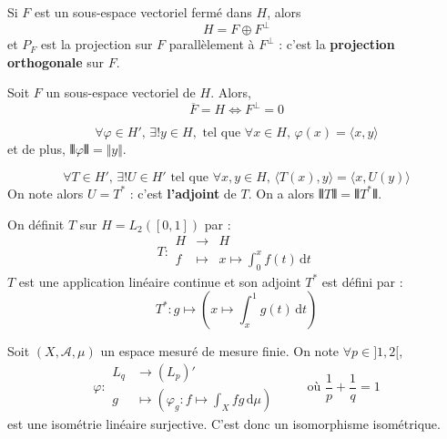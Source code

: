   \begin{theorem}
    Si $F$ est un sous-espace vectoriel fermé dans $H$, alors
    \[ H = F \oplus F^\perp \]
    et $P_F$ est la projection sur $F$ parallèlement à $F^\perp$ : c'est la \textbf{projection orthogonale} sur $F$.
  \end{theorem}

  \begin{corollary}
    Soit $F$ un sous-espace vectoriel de $H$. Alors,
    \[ \overline{F} = H \iff F^\perp = 0 \]
  \end{corollary}

  \begin{theorem}
    \[ \forall \varphi \in H', \, \exists! y \in H, \text{ tel que } \forall x \in H, \, \varphi(x) = \langle x, y \rangle \]
    et de plus, $\VERT \varphi \VERT = \Vert y \Vert$.
  \end{theorem}

  \begin{corollary}
    \[ \forall T \in H', \, \exists! U \in H' \text{ tel que } \forall x, y \in H, \, \langle T(x), y \rangle = \langle x, U(y) \rangle \]
    On note alors $U = T^*$ : c'est \textbf{l'adjoint} de $T$. On a alors $\VERT T \VERT = \VERT T^* \VERT$.
  \end{corollary}


  \begin{example}
    On définit $T$ sur $H = L_2([0,1])$ par :
    \[
    T : \begin{array}{ccc}
      H &\rightarrow& H \\
      f &\mapsto& x \mapsto \int_{0}^{x} f(t) \, \mathrm{d}t
    \end{array}
    \]
    $T$ est une application linéaire continue et son adjoint $T^*$ est défini par :
    \[ T^* : g \mapsto \left(x \mapsto \int_x^1 g(t) \, \mathrm{d}t \right) \]
  \end{example}


  \begin{application}[Dual de $L_p$]
    Soit $(X, \mathcal{A}, \mu)$ un espace mesuré de mesure finie. On note $\forall p \in ]1,2[$,
    \[
    \varphi :
    \begin{array}{ll}
      L_q &\rightarrow (L_p)' \\
      g &\mapsto \left( \varphi_g : f \mapsto \int_X f g \, \mathrm{d}\mu \right)
    \end{array}
    \qquad \text{ où } \frac{1}{p} + \frac{1}{q} = 1
    \]
    est une isométrie linéaire surjective. C'est donc un isomorphisme isométrique.
  \end{application}

